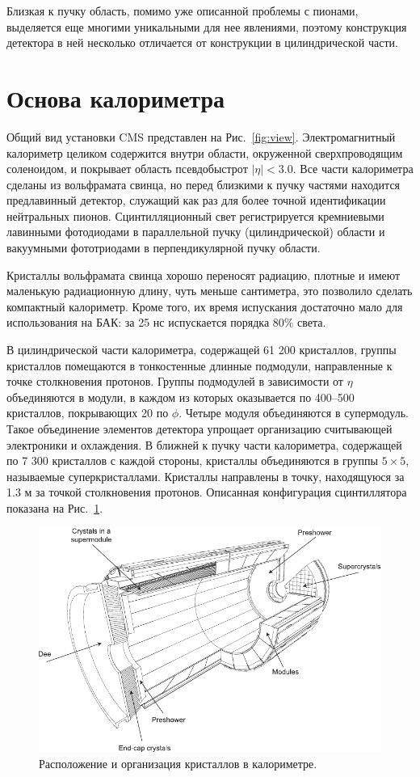 \documentclass[a4paper, 10pt, twocolumn]{article}
\begin{document}
Близкая к пучку область, помимо уже описанной проблемы с пионами, выделяется еще многими уникальными для нее явлениями, поэтому конструкция детектора в ней несколько отличается от конструкции в цилиндрической части. 

\section{Основа калориметра}

Общий вид установки CMS представлен на Рис.~\ref{fig:view}. 
Электромагнитный калориметр целиком содержится внутри области, окруженной сверхпроводящим соленоидом, и покрывает область псевдобыстрот $|\eta|<3.0$. 
Все части калориметра сделаны из вольфрамата свинца, но перед близкими к пучку частями находится предлавинный детектор, служащий как раз для более точной идентификации нейтральных пионов. 
Сцинтилляционный свет регистрируется кремниевыми лавинными фотодиодами в параллельной пучку (цилиндрической) области и вакуумными фототриодами в перпендикулярной пучку области. 

Кристаллы вольфрамата свинца хорошо переносят радиацию, плотные и имеют маленькую радиационную длину, чуть меньше сантиметра, это позволило сделать компактный калориметр. 
Кроме того, их время испускания достаточно мало для использования на БАК: за 25 нс испускается порядка 80\% света. 

В цилиндрической части калориметра, содержащей 61 200 кристаллов, группы кристаллов помещаются в тонкостенные длинные подмодули, направленные к точке столкновения протонов. 
Группы подмодулей в зависимости от $\eta$ объединяются в модули, в каждом из которых оказывается по 400--500 кристаллов, покрывающих 20\degree{} по $\phi$. 
Четыре модуля объединяются в супермодуль. 
Такое объединение элементов детектора упрощает организацию считывающей электроники и охлаждения. 
В ближней к пучку части калориметра, содержащей по 7 300 кристаллов с каждой стороны, кристаллы объединяются в группы $5\times5$, называемые суперкристаллами. 
Кристаллы направлены в точку, находящуюся за 1.3 м за точкой столкновения протонов. 
Описанная конфигурация сцинтиллятора показана на Рис.~\ref{fig:crystals}.

\begin{figure}[b!]
\includegraphics[width=.9\linewidth]{figures/Crystals}
\caption{Расположение и организация кристаллов в калориметре.}
\label{fig:crystals}
\end{figure}
\end{document}
